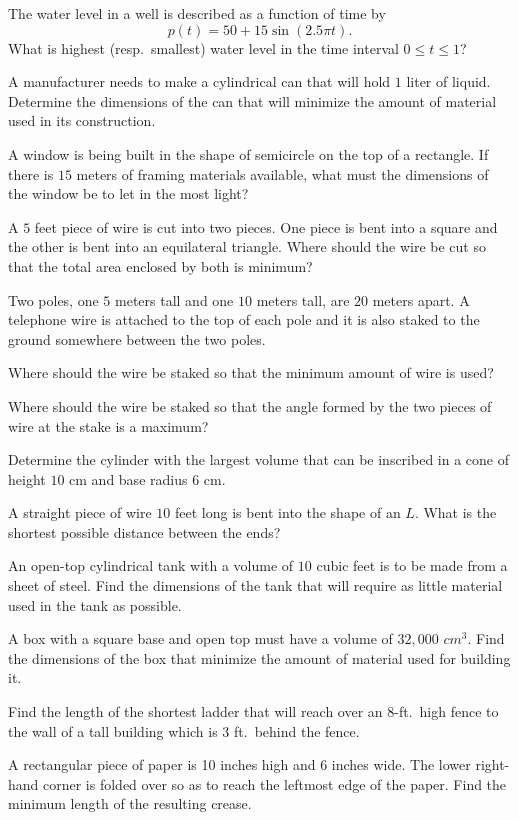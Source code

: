 \begin{multicols}{2}
\subprob The water level in a well is described as a function of time by
\[
  p(t) = 50 +15\sin(2.5\pi t).
\]
What is highest (resp.~smallest) water level in the time
interval $0 \leq t \leq 1$?


\problem A manufacturer needs to make a cylindrical can that will hold $1$ liter
of liquid.  Determine the dimensions of the can that will minimize the amount of
material used in its construction.

\problem A window is being built in the shape of semicircle on the top of a
rectangle. If there is $15$ meters of framing materials available, what must the
dimensions of the window be to let in the most light?

\problem A $5$ feet piece of wire is cut into two pieces. One piece is bent into
a square and the other is bent into an equilateral triangle.  Where should the
wire be cut so that the total area enclosed by both is minimum?

\problem Two poles, one $5$ meters tall and one $10$ meters tall, are $20$
meters apart.  A telephone wire is attached to the top of each pole and it is
also staked to the ground somewhere between the two poles.

\subprob Where should the wire be staked so that the minimum amount of wire is
used?

\subprob Where should the wire be staked so that the angle formed by the two
pieces of wire at the stake is a maximum?


\problem Determine the cylinder with the largest volume that can be
inscribed in a cone of height $10$ cm and base radius $6$ cm.



\problem A straight piece of wire $10$ feet long is bent into the shape of an
$L$. What is the shortest possible distance between the ends?

\problem An open-top cylindrical tank with a volume of $10$ cubic feet is to be
made from a sheet of steel. Find the dimensions of the tank that will require as
little material used in the tank as possible.

\problem A box with a square base and open top must have a volume of $32,000$
$cm^3$. Find the dimensions of the box that minimize the amount of material used
for building it.

\problem Find the length of the shortest ladder that will reach over an
8-ft.~high fence to the wall of a tall building which is 3 ft.~behind the
fence.

\problem A rectangular piece of paper is 10 inches high and 6 inches
wide. The lower right-hand corner is folded over so as to reach the
leftmost edge of the paper. Find the minimum length of the resulting
crease.




\end{multicols}
